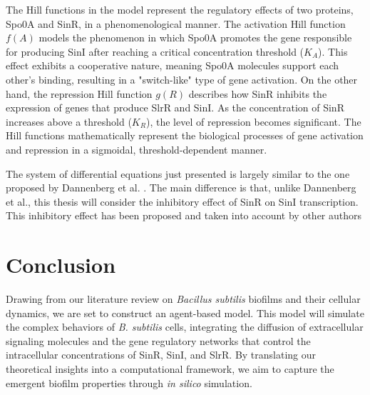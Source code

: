 The Hill functions in the model represent the regulatory effects of two proteins, Spo0A and SinR, in a phenomenological manner. The activation Hill function \( f(A) \) models the phenomenon in which Spo0A promotes the gene responsible for producing SinI after reaching a critical concentration threshold ($K_A$). This effect exhibits a cooperative nature, meaning Spo0A molecules support each other's binding, resulting in a "switch-like" type of gene activation. On the other hand, the repression Hill function \( g(R) \) describes how SinR inhibits the expression of genes that produce SlrR and SinI. As the concentration of SinR increases above a threshold ($K_R$), the level of repression becomes significant. The Hill functions mathematically represent the biological processes of gene activation and repression in a sigmoidal, threshold-dependent manner.

The system of differential equations just presented is largely similar to the one proposed by Dannenberg et al. {\footnotesize\cite{simon}}. The main difference is that, unlike Dannenberg et al., this thesis will consider the inhibitory effect of SinR on SinI transcription. This inhibitory effect has been proposed and taken into account by other authors {\footnotesize\cite{Voigt2005}\cite{Pedreira2021}\cite{Dundee2022}\cite{Hallinan2010}}

\section{Conclusion}\label{sec:litrev:conclusion}

Drawing from our literature review on \textit{Bacillus subtilis} biofilms and their cellular dynamics, we are set to construct an agent-based model. This model will simulate the complex behaviors of \textit{B. subtilis} cells, integrating the diffusion of extracellular signaling molecules and the gene regulatory networks that control the intracellular concentrations of SinR, SinI, and SlrR. By translating our theoretical insights into a computational framework, we aim to capture the emergent biofilm properties through \textit{in silico} simulation.
